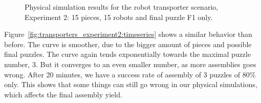 \begin{figure}[h!]
	\centering
	\; %
	\caption{Physical simulation results for the robot transporter scenario, Experiment 2: 15 pieces, 15 robots and final puzzle F1 only.}
\label{fig:transporters_experiment2} %
\end{figure}

Figure~\ref{fig:transporters_experiment2:timeseries} shows a similar behavior than before. The curve is smoother, due to the bigger amount of pieces and possible final puzzles. The curve again tends exponentially towards the maximal puzzle number, 3. But it converges to an even smaller number, as more assemblies goes wrong. After 20 minutes, we have a success rate of assembly of 3 puzzles of 80\% only. This shows that some things can still go wrong in our physical simulations, which affects the final assembly yield.

